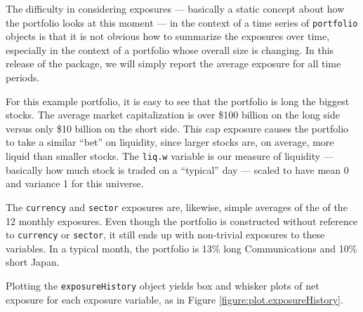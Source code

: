 \documentclass[a4paper]{report}
\begin{document}
\begin{article}
The difficulty in considering exposures --- basically a static concept
about how the portfolio looks at this moment --- in the context of a
time series of \texttt{portfolio} objects is that it is not obvious
how to summarize the exposures over time, especially in the context of
a portfolio whose overall size is changing. In this release of the
 package, we will simply report the average exposure
for all time periods. 

For this example portfolio, it is easy to see that the portfolio is
long the biggest stocks. The average market capitalization is over
\$100 billion on the long side versus only \$10 billion on the short
side.  This cap exposure causes the portfolio to take a similar
``bet'' on liquidity, since larger stocks are, on average, more liquid
than smaller stocks. The \texttt{liq.w} variable is our measure of
liquidity --- basically how much stock is traded on a ``typical'' day
--- scaled to have mean 0 and variance 1 for this universe.

The \texttt{currency} and \texttt{sector} exposures are, likewise,
simple averages of the of the 12 monthly exposures. Even though the
portfolio is constructed without reference to \texttt{currency} or
\texttt{sector}, it still ends up with non-trivial exposures to these
variables. In a typical month, the portfolio is 13\% long
Communications and 10\% short Japan.

Plotting the \texttt{exposureHistory} object yields box and whisker
plots of net exposure for each exposure variable, as in Figure
\ref{figure:plot.exposureHistory}.


\end{article}
\end{document}
